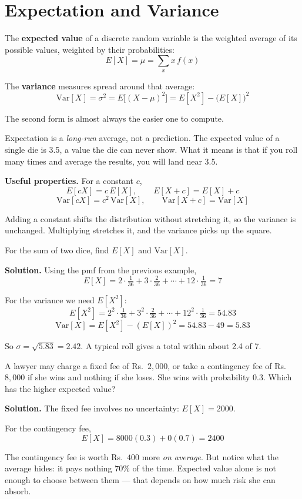 \documentclass[a4paper,11pt]{article}
\begin{document}
\section{Expectation and Variance}

\begin{keybox}
The \textbf{expected value} of a discrete random variable is the weighted
average of its possible values, weighted by their probabilities:
\[ E[X] = \mu = \sum_x x\, f(x) \]

The \textbf{variance} measures spread around that average:
\[ \mathrm{Var}[X] = \sigma^2 = E\big[(X-\mu)^2\big] = E[X^2] - \big(E[X]\big)^2 \]

The second form is almost always the easier one to compute.
\end{keybox}

Expectation is a \emph{long-run} average, not a prediction. The expected value
of a single die is 3.5, a value the die can never show. What it means is that if
you roll many times and average the results, you will land near 3.5.

\begin{keybox}
\textbf{Useful properties.} For a constant $c$,
\[ E[cX] = c\,E[X], \qquad E[X + c] = E[X] + c \]
\[ \mathrm{Var}[cX] = c^2\,\mathrm{Var}[X], \qquad \mathrm{Var}[X + c] = \mathrm{Var}[X] \]

Adding a constant shifts the distribution without stretching it, so the variance
is unchanged. Multiplying stretches it, and the variance picks up the square.
\end{keybox}

\begin{example}
For the sum of two dice, find $E[X]$ and $\mathrm{Var}[X]$.

\medskip
\textbf{Solution.} Using the pmf from the previous example,
\[ E[X] = 2\cdot\tfrac{1}{36} + 3\cdot\tfrac{2}{36} + \cdots + 12\cdot\tfrac{1}{36} = 7 \]

For the variance we need $E[X^2]$:
\[ E[X^2] = 2^2\cdot\tfrac{1}{36} + 3^2\cdot\tfrac{2}{36} + \cdots + 12^2\cdot\tfrac{1}{36} = 54.83 \]
\[ \mathrm{Var}[X] = E[X^2] - (E[X])^2 = 54.83 - 49 = 5.83 \]

So $\sigma = \sqrt{5.83} = 2.42$. A typical roll gives a total within about 2.4
of 7.
\end{example}

\begin{example}
A lawyer may charge a fixed fee of Rs.~$2{,}000$, or take a
contingency fee of Rs.~$8{,}000$ if she wins and nothing if she
loses. She wins with probability $0.3$. Which has the higher expected value?

\medskip
\textbf{Solution.} The fixed fee involves no uncertainty: $E[X] = 2000$.

For the contingency fee,
\[ E[X] = 8000(0.3) + 0(0.7) = 2400 \]

The contingency fee is worth Rs.~$400$ more \emph{on average}. But
notice what the average hides: it pays nothing $70\%$ of the time. Expected value
alone is not enough to choose between them --- that depends on how much risk she
can absorb.
\end{example}
\end{document}
